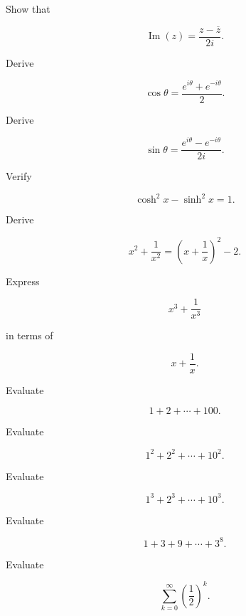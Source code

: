 \begin{exercise}[2]
Show that

\[
\operatorname{Im}(z)
=
\frac{z-\overline z}{2i}.
\]
\end{exercise}

\begin{exercise}[2]
Derive

\[
\cos\theta
=
\frac{e^{i\theta}+e^{-i\theta}}{2}.
\]
\end{exercise}

\begin{exercise}[2]
Derive

\[
\sin\theta
=
\frac{e^{i\theta}-e^{-i\theta}}{2i}.
\]
\end{exercise}

\begin{exercise}[2]
Verify

\[
\cosh^2x-\sinh^2x=1.
\]
\end{exercise}

\begin{exercise}[2]
Derive

\[
x^2+\frac1{x^2}
=
\left(
x+\frac1x
\right)^2-2.
\]
\end{exercise}

\begin{exercise}[3]
Express

\[
x^3+\frac1{x^3}
\]

in terms of

\[
x+\frac1x.
\]
\end{exercise}

\begin{exercise}[2]
Evaluate

\[
1+2+\cdots+100.
\]
\end{exercise}

\begin{exercise}[2]
Evaluate

\[
1^2+2^2+\cdots+10^2.
\]
\end{exercise}

\begin{exercise}[2]
Evaluate

\[
1^3+2^3+\cdots+10^3.
\]
\end{exercise}

\begin{exercise}[2]
Evaluate

\[
1+3+9+\cdots+3^8.
\]
\end{exercise}

\begin{exercise}[2]
Evaluate

\[
\sum_{k=0}^{\infty}
\left(
\frac12
\right)^k.
\]
\end{exercise}


